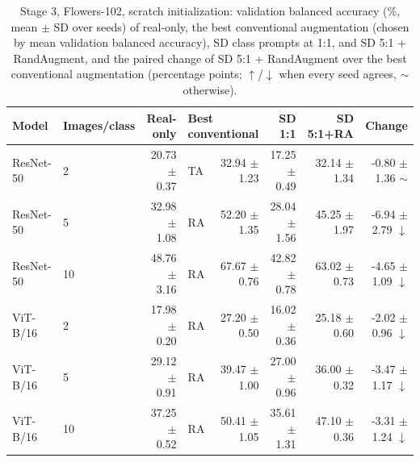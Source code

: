 \begin{table}[H]
\centering
\small
\setlength{\tabcolsep}{4pt}
\caption{Stage 3, Flowers-102, scratch initialization: validation balanced accuracy (\%, mean $\pm$ SD over seeds) of real-only, the best conventional augmentation (chosen by mean validation balanced accuracy), SD class prompts at 1:1, and SD 5:1 + RandAugment, and the paired change of SD 5:1 + RandAugment over the best conventional augmentation (percentage points; $\uparrow$/$\downarrow$ when every seed agrees, $\sim$ otherwise).}
\label{tab:stage3-flowers102-scores-scratch}
\begin{tabular}{llrlrrrr}
\toprule
Model & Images/class & Real-only & \multicolumn{2}{l}{Best conventional} & SD 1:1 & SD 5:1+RA & Change \\
\midrule
ResNet-50 & 2 & 20.73 $\pm$ 0.37 & TA & 32.94 $\pm$ 1.23 & 17.25 $\pm$ 0.49 & 32.14 $\pm$ 1.34 & -0.80 $\pm$ 1.36 $\sim$ \\
ResNet-50 & 5 & 32.98 $\pm$ 1.08 & RA & 52.20 $\pm$ 1.35 & 28.04 $\pm$ 1.56 & 45.25 $\pm$ 1.97 & -6.94 $\pm$ 2.79 $\downarrow$ \\
ResNet-50 & 10 & 48.76 $\pm$ 3.16 & RA & 67.67 $\pm$ 0.76 & 42.82 $\pm$ 0.78 & 63.02 $\pm$ 0.73 & -4.65 $\pm$ 1.09 $\downarrow$ \\
ViT-B/16 & 2 & 17.98 $\pm$ 0.20 & RA & 27.20 $\pm$ 0.50 & 16.02 $\pm$ 0.36 & 25.18 $\pm$ 0.60 & -2.02 $\pm$ 0.96 $\downarrow$ \\
ViT-B/16 & 5 & 29.12 $\pm$ 0.91 & RA & 39.47 $\pm$ 1.00 & 27.00 $\pm$ 0.96 & 36.00 $\pm$ 0.32 & -3.47 $\pm$ 1.17 $\downarrow$ \\
ViT-B/16 & 10 & 37.25 $\pm$ 0.52 & RA & 50.41 $\pm$ 1.05 & 35.61 $\pm$ 1.31 & 47.10 $\pm$ 0.36 & -3.31 $\pm$ 1.24 $\downarrow$ \\
\bottomrule
\end{tabular}
\end{table}
